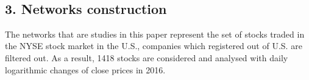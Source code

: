 \documentclass[11pt]{article}
\begin{document}
    \begin{center}
    \end{center}
    { \hspace*{\fill} \\}
    
    \hypertarget{networks-construction}{%
\subsection{3. Networks construction}\label{networks-construction}}

The networks that are studies in this paper represent the set of stocks
traded in the NYSE stock market in the U.S., companies which registered
out of U.S. are filtered out. As a result, 1418 stocks are considered
and analysed with daily logarithmic changes of close prices in 2016.
\end{document}
